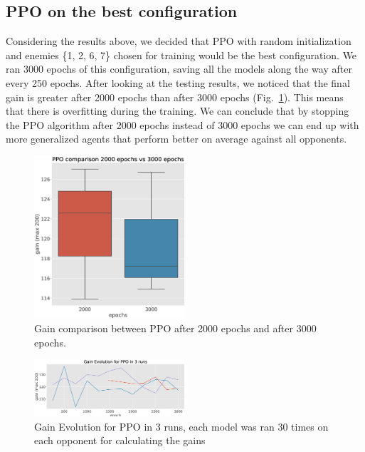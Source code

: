 \documentclass[conference]{IEEEtran}
\begin{document}
    \subsection{PPO on the best configuration}\label{subsec:ppo-on-the-best-configuration}
    Considering the results above, we decided that PPO with random initialization and enemies \{1, 2, 6, 7\} chosen for training would be the best configuration. We ran 3000 epochs of this configuration, saving all the models along the way after every 250 epochs.
    After looking at the testing results, we noticed that the final gain is greater after 2000 epochs than after 3000 epochs (Fig.~\ref{fig:ppo_2000_vs_3000_epochs}).
    This means that there is overfitting during the training.
    We can conclude that by stopping the PPO algorithm after 2000 epochs instead of 3000 epochs
    we can end up with more generalized agents that perform better on average against all opponents.
    \begin{figure}[htbp]
        \centering
        \includegraphics[width=0.5\textwidth]{images/ppo_2000_vs_3000_epochs.eps}
        \caption{Gain comparison between PPO after 2000 epochs and after 3000 epochs.}
        \label{fig:ppo_2000_vs_3000_epochs}
    \end{figure}

    \begin{figure}[htbp]
        \centering
        \includegraphics[width=0.5\textwidth]{images/ppo_gain_evolution_3_runs.eps}
        \caption{Gain Evolution for PPO in 3 runs, each model was ran 30 times on each opponent for calculating the gains}
        \label{fig:ppo_gain_evolution_3_runs}
    \end{figure}
\end{document}
